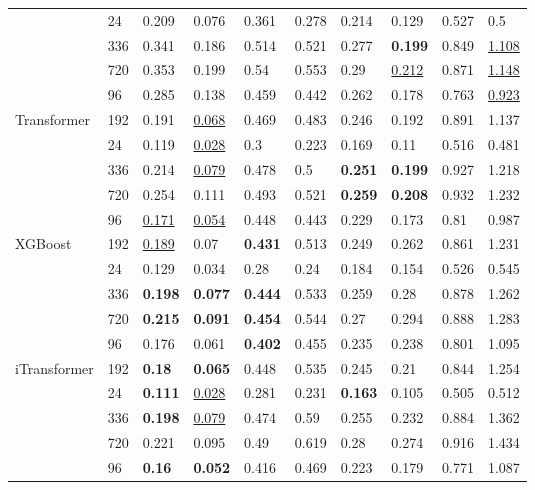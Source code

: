 \begin{tabular}{llllllllll}
 & 24 & 0.209 & 0.076 & 0.361 & 0.278 & 0.214 & 0.129 & 0.527 & 0.5 \\
 & 336 & 0.341 & 0.186 & 0.514 & 0.521 & 0.277 & \textbf{0.199} & 0.849 & \underline{1.108} \\
 & 720 & 0.353 & 0.199 & 0.54 & 0.553 & 0.29 & \underline{0.212} & 0.871 & \underline{1.148} \\
 & 96 & 0.285 & 0.138 & 0.459 & 0.442 & 0.262 & 0.178 & 0.763 & \underline{0.923} \\
\cline{1-10}
\multirow[t]{5}{*}{Transformer} & 192 & 0.191 & \underline{0.068} & 0.469 & 0.483 & 0.246 & 0.192 & 0.891 & 1.137 \\
 & 24 & 0.119 & \underline{0.028} & 0.3 & 0.223 & 0.169 & 0.11 & 0.516 & 0.481 \\
 & 336 & 0.214 & \underline{0.079} & 0.478 & 0.5 & \textbf{0.251} & \textbf{0.199} & 0.927 & 1.218 \\
 & 720 & 0.254 & 0.111 & 0.493 & 0.521 & \textbf{0.259} & \textbf{0.208} & 0.932 & 1.232 \\
 & 96 & \underline{0.171} & \underline{0.054} & 0.448 & 0.443 & 0.229 & 0.173 & 0.81 & 0.987 \\
\cline{1-10}
\multirow[t]{5}{*}{XGBoost} & 192 & \underline{0.189} & 0.07 & \textbf{0.431} & 0.513 & 0.249 & 0.262 & 0.861 & 1.231 \\
 & 24 & 0.129 & 0.034 & 0.28 & 0.24 & 0.184 & 0.154 & 0.526 & 0.545 \\
 & 336 & \textbf{0.198} & \textbf{0.077} & \textbf{0.444} & 0.533 & 0.259 & 0.28 & 0.878 & 1.262 \\
 & 720 & \textbf{0.215} & \textbf{0.091} & \textbf{0.454} & 0.544 & 0.27 & 0.294 & 0.888 & 1.283 \\
 & 96 & 0.176 & 0.061 & \textbf{0.402} & 0.455 & 0.235 & 0.238 & 0.801 & 1.095 \\
\cline{1-10}
\multirow[t]{5}{*}{iTransformer} & 192 & \textbf{0.18} & \textbf{0.065} & 0.448 & 0.535 & 0.245 & 0.21 & 0.844 & 1.254 \\
 & 24 & \textbf{0.111} & \underline{0.028} & 0.281 & 0.231 & \textbf{0.163} & 0.105 & 0.505 & 0.512 \\
 & 336 & \textbf{0.198} & \underline{0.079} & 0.474 & 0.59 & 0.255 & 0.232 & 0.884 & 1.362 \\
 & 720 & 0.221 & 0.095 & 0.49 & 0.619 & 0.28 & 0.274 & 0.916 & 1.434 \\
 & 96 & \textbf{0.16} & \textbf{0.052} & 0.416 & 0.469 & 0.223 & 0.179 & 0.771 & 1.087 \\
\cline{1-10}
\bottomrule
\end{tabular}
